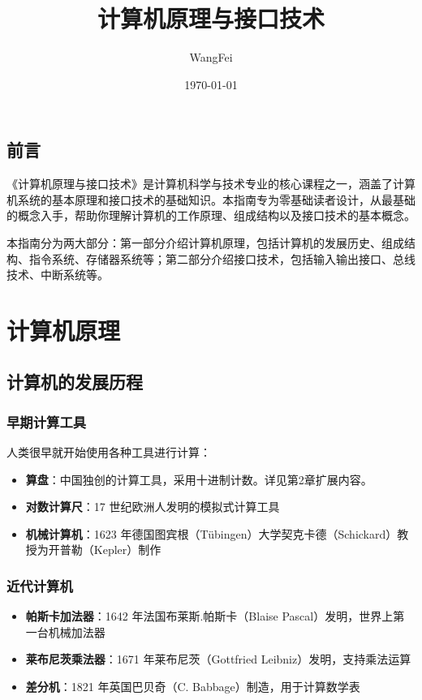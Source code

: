 \documentclass[12pt,UTF8]{ctexbook}
\title{\heiti\zihao{0} 计算机原理与接口技术}
\author{WangFei}
\date{\today}
\begin{document}
\maketitle
\tableofcontents

\frontmatter
\chapter{前言}

《计算机原理与接口技术》是计算机科学与技术专业的核心课程之一，涵盖了计算机系统的基本原理和接口技术的基础知识。本指南专为零基础读者设计，从最基础的概念入手，帮助你理解计算机的工作原理、组成结构以及接口技术的基本概念。

本指南分为两大部分：第一部分介绍计算机原理，包括计算机的发展历史、组成结构、指令系统、存储器系统等；第二部分介绍接口技术，包括输入输出接口、总线技术、中断系统等。

\mainmatter

\part{计算机原理}

\chapter{计算机的发展历程}
\label{chap:history}

\section{早期计算工具}

人类很早就开始使用各种工具进行计算：

\begin{itemize}[leftmargin=2cm]
    \item \textbf{算盘}：中国独创的计算工具，采用十进制计数。详见第2章扩展内容。
    \item \textbf{对数计算尺}：17 世纪欧洲人发明的模拟式计算工具
    \item \textbf{机械计算机}：1623 年德国图宾根（Tübingen）大学契克卡德（Schickard）教授为开普勒（Kepler）制作
\end{itemize}

\section{近代计算机}

\begin{itemize}[leftmargin=2cm]
    \item \textbf{帕斯卡加法器}：1642 年法国布莱斯.帕斯卡（Blaise Pascal）发明，世界上第一台机械加法器
    \item \textbf{莱布尼茨乘法器}：1671 年莱布尼茨（Gottfried Leibniz）发明，支持乘法运算
    \item \textbf{差分机}：1821 年英国巴贝奇（C. Babbage）制造，用于计算数学表
\end{itemize}
\end{document}
